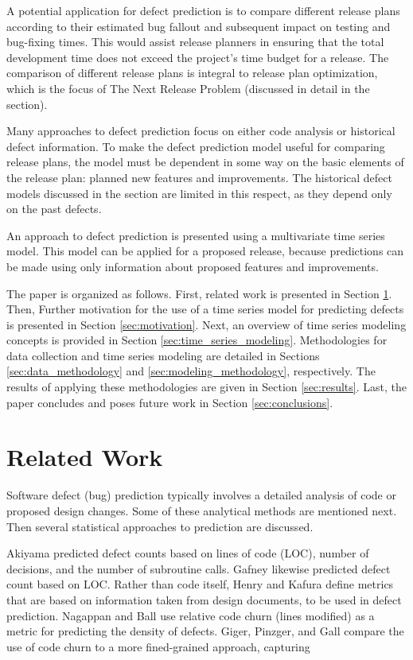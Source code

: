 \documentclass[letterpaper]{report}
\begin{document}
A potential application for defect prediction is to compare different release plans according to their estimated bug fallout and subsequent impact on testing and bug-fixing times. This would assist release planners in ensuring that the total development time does not exceed the project’s time budget for a release. The comparison of different release plans is integral to release plan optimization, which is the focus of The Next Release Problem (discussed in detail in the  section).

Many approaches to defect prediction focus on either code analysis or historical defect information. To make the defect prediction model useful for comparing release plans, the model must be dependent in some way on the basic elements of the release plan: planned new features and improvements. The historical defect models discussed in the  section are limited in this respect, as they depend only on the past defects. 

An approach to defect prediction is presented using a multivariate time series model. This model can be applied for a proposed release, because predictions can be made using only information about proposed features and improvements.

The paper is organized as follows. First, related work is presented in Section \ref{sec:related_work}. Then, Further motivation for the use of a time series model for predicting defects is presented in Section \ref{sec:motivation}. Next, an overview of time series modeling concepts is provided in Section \ref{sec:time_series_modeling}. Methodologies for data collection and time series modeling are detailed in Sections \ref{sec:data_methodology} and \ref{sec:modeling_methodology}, respectively. The results of applying these methodologies are given in Section \ref{sec:results}.  Last, the paper concludes and poses future work in Section \ref{sec:conclusions}.

\chapter{Related Work}
\label{sec:related_work}

Software defect (bug) prediction typically involves a detailed analysis of code or proposed design changes. Some of these analytical methods are mentioned next. Then several statistical approaches to prediction are discussed.

Akiyama \cite{1971_akiyama} predicted defect counts based on lines of code (LOC), number of decisions, and the number of subroutine calls. Gafney \cite{1984_gaffney_estimating} likewise predicted defect count based on LOC. Rather than code itself, Henry and Kafura \cite{1984_henry_evaluation} define metrics that are based on information taken from design documents, to be used in defect prediction. Nagappan and Ball \cite{2005_nagappan_codechurn} use relative code churn (lines modified) as a metric for predicting the density of defects. Giger, Pinzger, and Gall \cite{2011_giger_finegrained} compare the use of code churn to a more fined-grained approach, capturing 
\end{document}

